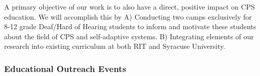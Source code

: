 \documentclass[11pt]{proposalnsf}
\newcommand{\dan}[1]{\textcolor{blue}{{\it [Dan says: #1]}}}
\begin{document}
\begin{sloppypar}
A primary objective of our work is to also have a direct, positive impact on CPS education. We will accomplish this by A) Conducting two camps exclusively for 8-12 grade Deaf/Hard of Hearing students to inform and motivate these students about the field of CPS and self-adaptive systems. B) Integrating elements of our research into existing curriculum at both RIT and Syracuse University.


% 




%	




 \subsubsection*{Educational Outreach Events}


\end{sloppypar}
\end{document}

